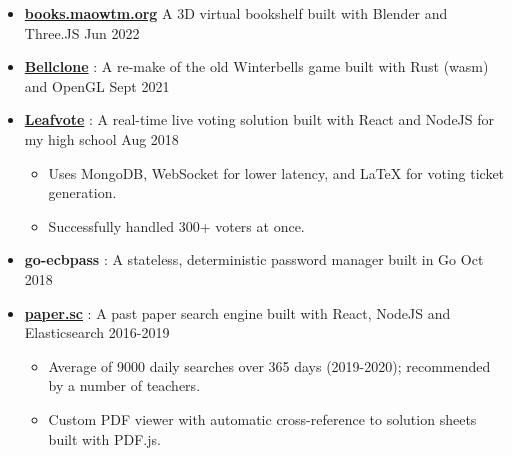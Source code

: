   \begin{itemize}

    \item \href{https://books.maowtm.org}{\textbf{\color{link}books.maowtm.org}}  \dashdiv{} A 3D virtual bookshelf built with Blender and Three.JS \dashdiv{} Jun 2022

    \item \href{https://bellclone.maowtm.org/}{\color{link}\textbf{Bellclone}} : A re-make of the old Winterbells game built with Rust (wasm) and OpenGL \dashdiv{} Sept 2021

    \item \href{https://leafvote.mww.moe}{\color{link}\textbf{Leafvote}} : A real-time live voting solution built with React and NodeJS for my high school \dashdiv{} Aug 2018

    \begin{itemize}
      \item Uses MongoDB, WebSocket for lower latency, and LaTeX for voting ticket generation.
      \item Successfully handled 300+ voters at once.
    \end{itemize}

    \item \textbf{go-ecbpass} : A stateless, deterministic password manager built in Go \dashdiv{} Oct 2018

    \item \href{https://paper.sc}{\color{link}\textbf{paper.sc}} : A past paper search engine built with React, NodeJS and Elasticsearch \dashdiv{} 2016-2019

    \begin{itemize}
      \item Average of \raisebox{0.2\baselineskip}{\texttildelow}9000 daily searches over 365 days (2019-2020); recommended by a number of teachers.
      \item Custom PDF viewer with automatic cross-reference to solution sheets built with PDF.js.
    \end{itemize}


  \end{itemize}


